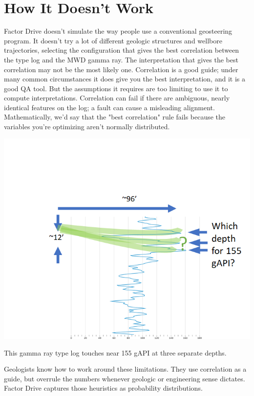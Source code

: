 \documentclass{tufte-handout}
\begin{document}
\section{How It Doesn't Work}\label{sec:how-it-doesnt-work}
Factor Drive doesn't simulate the way people use a conventional geosteering program.
It doesn't try a lot of different geologic structures and wellbore trajectories, selecting
the configuration that gives the best correlation between the type log and the MWD gamma ray. The
interpretation that gives the best correlation may not be the most likely one.
Correlation is a good guide; under many common circumstances it does give you the best
interpretation, and it is a good QA tool. But the assumptions it requires are too limiting to use it to compute interpretations.
Correlation can fail if there are ambiguous, nearly identical features on the log; a fault can cause a misleading alignment. Mathematically, we'd say that the "best correlation" rule fails because the variables you're optimizing aren't normally distributed.

\begin{marginfigure}
  \includegraphics{which-depth-for-155-gapi.png}
  \caption{This gamma ray type log touches near 155 gAPI at three separate depths.}
  \label{fig:which-depth-for-155-gapi}
\end{marginfigure}

Geologists know how to work around these limitations. They use correlation as a guide, but overrule the numbers whenever geologic or engineering sense dictates. Factor Drive captures those heuristics as probability distributions.
\end{document}
